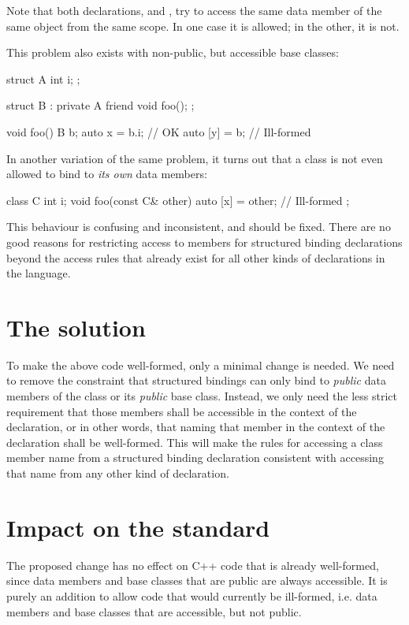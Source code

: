 Note that both declarations,  and , try to access the same data member of the same object from the same scope. In one case it is allowed; in the other, it is not.

This problem also exists with non-public, but accessible base classes:

\begin{codeblock}
struct A {
   int i;
};

struct B : private A {
   friend void foo();
};

void foo() {
   B b;
   auto x = b.i;  // OK
   auto [y] = b;  // Ill-formed
}
\end{codeblock}

In another variation of the same problem, it turns out that a class is not even allowed to bind to \emph{its own} data members:

\begin{codeblock}
class C {
    int i;
    void foo(const C& other) {
        auto [x] = other;  // Ill-formed
    }
};
\end{codeblock}

This behaviour is confusing and inconsistent, and should be fixed. There are no good reasons for restricting access to members for structured binding declarations beyond the access rules that already exist for all other kinds of declarations in the language.

\section{The solution}

To make the above code well-formed, only a minimal change is needed. We need to remove the constraint that structured bindings can only bind to \emph{public} data members of the class or its \emph{public} base class. Instead, we only need the less strict requirement that those members shall be accessible in the context of the declaration, or in other words, that naming that member in the context of the declaration shall be well-formed. This will make the rules for accessing a class member name from a structured binding declaration consistent with accessing that name from any other kind of declaration.

\section{Impact on the standard}

The proposed change has no effect on C++ code that is already well-formed, since data members and base classes that are public are always accessible. It is purely an addition to allow code that would currently be ill-formed, i.e. data members and base classes that are accessible, but not public.

